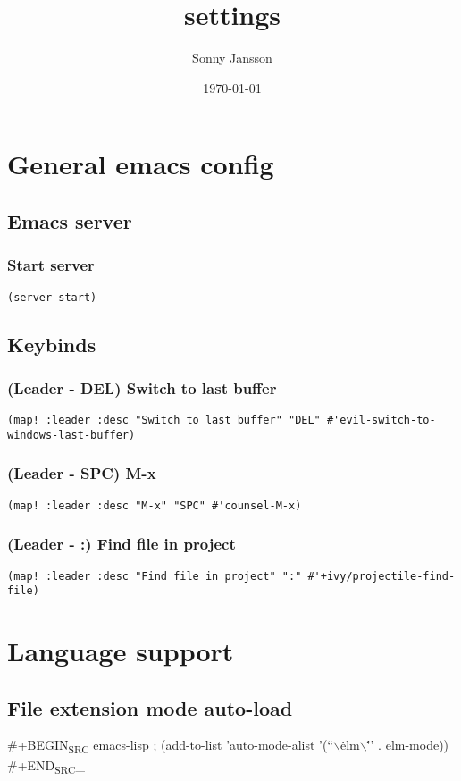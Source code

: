 \documentclass[11pt]{article}
\author{Sonny Jansson}
\date{\today}
\title{settings}
\begin{document}
\maketitle
\tableofcontents


\section{General emacs config}
\label{sec:org5d30e8c}
\subsection{Emacs server}
\label{sec:org9ce2a46}
\subsubsection{Start server}
\label{sec:org04546a3}
\begin{verbatim}
(server-start)
\end{verbatim}
\subsection{Keybinds}
\label{sec:org34b6c4e}
\subsubsection{(Leader - DEL) Switch to last buffer}
\label{sec:org8571374}
\begin{verbatim}
(map! :leader :desc "Switch to last buffer" "DEL" #'evil-switch-to-windows-last-buffer)
\end{verbatim}

\subsubsection{(Leader - SPC) M-x}
\label{sec:org99aab23}
\begin{verbatim}
(map! :leader :desc "M-x" "SPC" #'counsel-M-x)
\end{verbatim}

\subsubsection{(Leader - :) Find file in project}
\label{sec:orgeb88882}
\begin{verbatim}
(map! :leader :desc "Find file in project" ":" #'+ivy/projectile-find-file)
\end{verbatim}

\section{Language support}
\label{sec:orgccbc8e5}
\subsection{File extension mode auto-load}
\label{sec:orgc3f630b}
\#+BEGIN\textsubscript{SRC} emacs-lisp
; (add-to-list 'auto-mode-alist '(``$\backslash$\.elm$\backslash$\''' . elm-mode))
\#+END\textsubscript{SRC}\_
\end{document}
